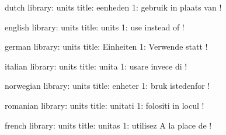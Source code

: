 


\startmessages  dutch  library: units
  title: eenheden
      1: gebruik \string\Degrees\space\string\Celsius\space in plaats van \string\Celsius !
\stopmessages

\startmessages  english  library: units
  title: units
      1: use \string\Degrees\space\string\Celsius\space instead of \string\Celsius !
\stopmessages

\startmessages  german  library: units
  title: Einheiten
      1: Verwende \string\Degrees\space\string\Celsius\space statt \string\Celsius !
\stopmessages

\startmessages  italian  library: units
  title: unita
      1: usare \string\Degrees\space\string\Celsius\space invece di \string\Celsius !
\stopmessages

\startmessages  norwegian  library: units
  title: enheter
      1: bruk \string\Degrees\space\string\Celsius\space istedenfor \string\Celsius !
\stopmessages

\startmessages  romanian  library: units
  title: unitati
      1: folositi \string\Degrees\space\string\Celsius\space in locul \string\Celsius !
\stopmessages

\startmessages  french  library: units
  title: unitas
      1: utilisez \string\Degrees\space\string\Celsius\space A la place de \string\Celsius !
\stopmessages

\unprotect

